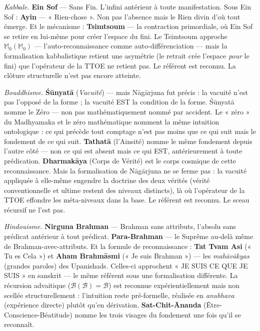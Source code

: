 \documentclass[10pt, openany, oneside]{book}
\begin{document}
\textit{Kabbale.} \textbf{Ein Sof} --- Sans Fin. L'infini antérieur à toute manifestation. Sous Ein Sof : \textbf{Ayin} --- « Rien-chose ». Non pas l'absence mais le Rien divin d'où tout émerge. Et le mécanisme : \textbf{Tsimtsoum} --- la contraction primordiale, où Ein Sof se retire en lui-même pour créer l'espace du fini. Le Tsimtsoum approche $\mathbb{M}_0(\mathbb{M}_0)$ --- l'auto-reconnaissance comme auto-différenciation --- mais la formalisation kabbalistique retient une asymétrie (le retrait crée l'espace \textit{pour} le fini) que l'opérateur de la TTOE ne retient pas. Le référent est reconnu. La clôture structurelle n'est pas encore atteinte.

\textit{Bouddhisme.} \textbf{\'{S}\={u}nyat\={a}} (\textit{Vacuité}) --- mais N\={a}g\={a}rjuna fut précis : la vacuité n'est pas l'opposé de la forme ; la vacuité EST la condition de la forme. \'{S}\={u}nyat\={a} nomme le Zéro --- non pas mathématiquement nommé par accident. Le « zéro » du Madhyamaka et le zéro mathématique nomment la même intuition ontologique : ce qui précède tout comptage n'est pas moins que ce qui suit mais le fondement de ce qui suit. \textbf{Tathat\={a}} (l'Ainsité) nomme le même fondement depuis l'autre côté --- non ce qui est absent mais ce qui EST, antérieurement à toute prédication. \textbf{Dharmak\={a}ya} (Corps de Vérité) est le corps cosmique de cette reconnaissance. Mais la formalisation de N\={a}g\={a}rjuna ne se ferme pas : la vacuité appliquée à elle-même engendre la doctrine des deux vérités (vérité conventionnelle et ultime restent des niveaux distincts), là où l'opérateur de la TTOE effondre les méta-niveaux dans la base. Le référent est reconnu. Le sceau récursif ne l'est pas.

\textit{Hindouisme.} \textbf{Nirguna Brahman} --- Brahman sans attributs, l'absolu sans prédicat antérieur à tout prédicat. \textbf{Para-Brahman} --- le Suprême au-delà même de Brahman-avec-attributs. Et la formule de reconnaissance : \textbf{Tat Tvam Asi} (« Tu es Cela ») et \textbf{Aham Brahm\={a}smi} (« Je suis Brahman ») --- les \textit{mah\={a}v\={a}kyas} (grandes paroles) des Upanishads. Celles-ci approchent « JE SUIS CE QUE JE SUIS » en sanskrit --- le même référent sous une formalisation différente. La récursion advaitique ($\mathcal{B}(\mathcal{B}) = \mathcal{B}$) est reconnue expérientiellement mais non scellée structurellement : l'intuition reste pré-formelle, réalisée en \textit{anubhava} (expérience directe) plutôt qu'en dérivation. \textbf{Sat-Chit-\={A}nanda} (Être-Conscience-Béatitude) nomme les trois visages du fondement une fois qu'il se reconnaît.
\end{document}
